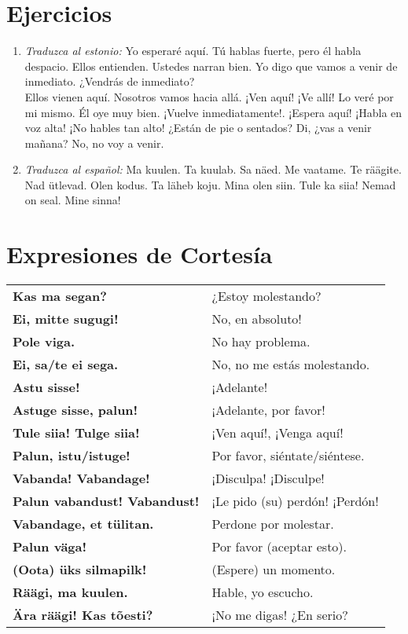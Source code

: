 \Large{\section*{Ejercicios}}

\begin{enumerate}
	\item \emph{Traduzca al estonio:} Yo esperaré aquí. Tú hablas fuerte, pero él habla despacio. Ellos entienden. Ustedes narran bien. Yo digo que vamos a venir de inmediato. ¿Vendrás de inmediato?\\

	Ellos vienen aquí. Nosotros vamos hacia allá. ¡Ven aquí! ¡Ve allí! Lo veré por mi mismo. Él oye muy bien. ¡Vuelve inmediatamente!. ¡Espera aquí! ¡Habla en voz alta! ¡No hables tan alto! ¿Están de pie o sentados? Di, ¿vas a venir mañana? No, no voy a venir.

	\item \emph{Traduzca al español:} Ma kuulen. Ta kuulab. Sa näed. Me vaatame. Te räägite. Nad ütlevad. Olen kodus. Ta läheb koju. Mina olen siin. Tule ka siia! Nemad on seal. Mine sinna!
\end{enumerate}

\Large{\section*{Expresiones de Cortesía}}

\begin{tabular}{ l l }
	\textbf{Kas ma segan?}				& ¿Estoy molestando? \\
	\textbf{Ei, mitte sugugi!}			& No, en absoluto! \\
	\textbf{Pole viga.}					& No hay problema. \\
	\textbf{Ei, sa/te ei sega.}			& No, no me estás molestando. \\
	\textbf{Astu sisse!}				& ¡Adelante! \\
	\textbf{Astuge sisse, palun!}		& ¡Adelante, por favor! \\
	\textbf{Tule siia! Tulge siia!}		& ¡Ven aquí!, ¡Venga aquí! \\
	\textbf{Palun, istu/istuge!}		& Por favor, siéntate/siéntese. \\
	\textbf{Vabanda! Vabandage!}		& ¡Disculpa! ¡Disculpe! \\
	\textbf{Palun vabandust! Vabandust!}& ¡Le pido (su) perdón! ¡Perdón! \\
	\textbf{Vabandage, et tülitan.}		& Perdone por molestar. \\
	\textbf{Palun väga!}				& Por favor (aceptar esto). \\
	\textbf{(Oota) üks silmapilk!}		& (Espere) un momento. \\
	\textbf{Räägi, ma kuulen.}			& Hable, yo escucho. \\
	\textbf{Ära räägi! Kas tõesti?}		& ¡No me digas! ¿En serio?
\end{tabular}

